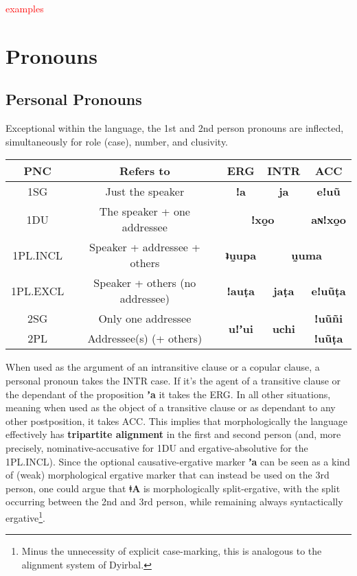 \documentclass[11pt,a5paper]{book}
\newcommand{\qcn}[1]{\textcolor{AccentText}{\large\textbf{#1}}}
\newcommand{\langname}{\qcn{ǂA}}
\newcommand{\grammsc}[1]{\textsc{#1}}
\newcommand{\ERG}{\grammsc{ERG}}
\newcommand{\ACC}{\grammsc{ACC}}
\newcommand{\INTR}{\grammsc{INTR}}
\newcommand{\cmnt}[1]{\textcolor{red}{#1}}
\begin{document}
\cmnt{examples}

\section{Pronouns}


\subsection{Personal Pronouns}

Exceptional within the language, the 1st and 2nd person pronouns are inflected, simultaneously for role (case), number, and clusivity.

\begin{center}
\begin{tabular}{|c|c|c|c|c|}
\hline
PNC & Refers to & \ERG & \INTR & \ACC \\ \hline \hline
1SG & Just the speaker &\qcn{ǃa} & \qcn{ja} & \qcn{eǃuũ}\\ \hline
1DU & The speaker + one addressee & \multicolumn{2}{c|}{\qcn{ǃxo̰o}} & \qcn{aɴǃxo̰o} \\ \hline
1PL.INCL & Speaker + addressee + others & \qcn{ʇṵupa} & \multicolumn{2}{c|}{\qcn{ṵuma}} \\ \hline
1PL.EXCL & Speaker + others (no addressee) &\qcn{ǃauṭa} & \qcn{jaṭa} & \qcn{eǃuũṭa}\\ \hline
2SG & Only one addressee &\multirow{2}{*}{\qcn{uǃʼui}} & \multirow{2}{*}{\qcn{uchi}} & \qcn{ǃuũñi}\\ \cline{1-2} \cline{5-5}
2PL & Addressee(s) (+ others) &  &  & \qcn{ǃuũṭa}\\\hline
\end{tabular}
\end{center}

When used as the argument of an intransitive clause or a copular clause, a personal pronoun takes the \INTR{} case. If it's the agent of a transitive clause or the dependant of the proposition \qcn{ʼa} it takes the \ERG{}. In all other situations, meaning when used as the object of a transitive clause or as dependant to any other postposition, it takes \ACC{}. This implies that morphologically the language effectively has \textbf{tripartite alignment} in the first and second person (and, more precisely, nominative-accusative for 1DU and ergative-absolutive for the 1PL.INCL). Since the optional causative-ergative marker \qcn{ʼa} can be seen as a kind of (weak) morphological ergative marker that can instead be used on the 3rd person, one could argue that \langname{} is morphologically split-ergative, with the split occurring between the 2nd and 3rd person, while remaining always syntactically ergative\footnote{Minus the unnecessity of explicit case-marking, this is analogous to the alignment system of Dyirbal.}.
\end{document}
